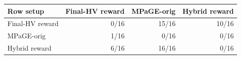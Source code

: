\begin{tabular}{lrrr}
\toprule
Row setup & Final-HV reward & MPaGE-orig & Hybrid reward \\
\midrule
Final-HV reward & 0/16 & 15/16 & 10/16 \\
MPaGE-orig & 1/16 & 0/16 & 0/16 \\
Hybrid reward & 6/16 & 16/16 & 0/16 \\
\bottomrule
\end{tabular}

